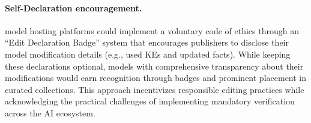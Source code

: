\paragraph{Self-Declaration encouragement.} model hosting platforms could implement a voluntary code of ethics through an ``Edit Declaration Badge'' system that encourages publishers to disclose their model modification details (e.g., used KEs and updated facts). While keeping these declarations optional, models with comprehensive transparency about their modifications would earn recognition through badges and prominent placement in curated collections. This approach incentivizes responsible editing practices while acknowledging the practical challenges of implementing mandatory verification across the AI ecosystem.

